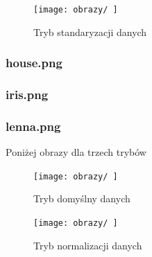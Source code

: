 \documentclass{classrep}
\begin{document}
{{{{\begin{figure}[!htbp]
\centering
\texttt{[image: obrazy/ ]}
\caption{Tryb standaryzacji danych}
\end{figure}
\FloatBarrier \fi
}

\subsubsection{house.png}
{
}

\subsubsection{iris.png}
{
}

\subsubsection{lenna.png}
{\iffalse
Poniżej obrazy dla trzech trybów
\begin{figure}[!htbp]
\centering
\texttt{[image: obrazy/ ]}
\caption{Tryb domyślny danych}
\end{figure}

\begin{figure}[!htbp]
\centering
\texttt{[image: obrazy/ ]}
\caption{Tryb normalizacji danych}
\end{figure}

}}}}
\end{document}
